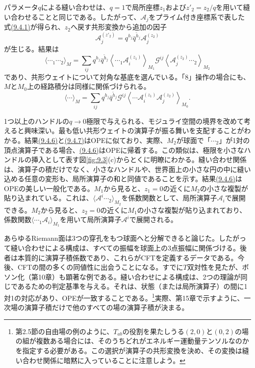 パラメータ$q$による縫い合わせは、$q=1$で局所座標$z_1$および$z'_2=z_2/q$を用いて縫い合わせることと同じである。したがって、$\mathcal A_j$をプライム付き座標系で表した式\hyperref[eq:9.4.1]{(9.4.1)}が得られ、$z_2$へ戻す共形変換から追加の因子
\begin{equation}
 \mathcal A_j^{(z'_2)}=q^{h_j}\bar q^{\tilde h_j}\mathcal A_j^{(z_2)}
 \tag{9.4.5}\label{eq:9.4.5}
\end{equation}
が生じる。結果は
\begin{equation}
 \langle\cdots_1\cdots_2\rangle_M
 =\sum_{ij}q^{h_j}\bar q^{\tilde h_j}
 \left\langle\cdots_1\mathcal A_i^{(z_1)}\right\rangle_{M_1}
 \mathcal G^{ij}\left\langle\mathcal A_j^{(z_2)}\cdots_2\right\rangle_{M_2}
 \tag{9.4.6}\label{eq:9.4.6}
\end{equation}
であり、共形ウェイトについて対角な基底を選んでいる。「$8$」操作の場合にも、$M$と$M_0$上の経路積分は同様に関係づけられる。
\begin{equation}
 \langle\cdots\rangle_M
 =\sum_{ij}q^{h_j}\bar q^{\tilde h_j}\mathcal G^{ij}
 \left\langle\cdots\mathcal A_i^{(z_1)}\mathcal A_j^{(z_2)}\right\rangle_{M_0}.
 \tag{9.4.7}\label{eq:9.4.7}
\end{equation}

1つ以上のハンドルの$q\to0$極限で与えられる、モジュライ空間の境界を改めて考えると興味深い。最も低い共形ウェイトの演算子が振る舞いを支配することがわかる。結果\hyperref[eq:9.4.6]{(9.4.6)}と\hyperref[eq:9.4.7]{(9.4.7)}はOPEに似ており、実際、$M_2$が球面で「$\cdots_2$」が1対の頂点演算子である場合、\hyperref[eq:9.4.6]{(9.4.6)}はOPEに帰着する。この類似は、極限を小さなハンドルの挿入として表す図\ref{fig:9.3}(c)からとくに明瞭にわかる。縫い合わせ関係は、演算子の積だけでなく、小さなハンドルや、世界面上の小さな円の中に縫い込める任意の変形も、局所演算子の和と同値であることを示す。結果\hyperref[eq:9.4.6]{(9.4.6)}はOPEの美しい一般化である。$M_1$から見ると、$z_1=0$の近くに$M_2$の小さな複製が貼り込まれている。これは、$\langle\mathcal A^i\cdots_2\rangle_{M_2}$を係数関数として、局所演算子$\mathcal A_i$で展開できる。$M_2$から見ると、$z_2=0$の近くに$M_1$の小さな複製が貼り込まれており、係数関数$\langle\cdots_1\mathcal A_i\rangle_{M_1}$を用いて局所演算子$\mathcal A^i$で展開される。

あらゆるRiemann面は3つの穿孔をもつ球面へと分解できると論じた。したがって縫い合わせによる構成は、すべての振幅を球面上の3点振幅に関係づける。後者は本質的に演算子積係数であり、これらがCFTを定義するデータである。今後、CFTの間の多くの同値性に出会うことになる。すでに$T$双対性を見たが、ボソン化（第10章）も顕著な例である。縫い合わせによる構成は、2つの理論が同じであるための判定基準を与える。それは、状態（または局所演算子）の間に1対1の対応があり、OPEが一致することである。\footnote[1]{第2.5節の自由場の例のように、$T_{ab}$の役割を果たしうる$(2,0)$と$(0,2)$の場の組が複数ある場合には、そのうちどれがエネルギー運動量テンソルなのかを指定する必要がある。この選択が演算子の共形変換を決め、その変換は縫い合わせ関係に暗黙に入っていることに注意しよう。}実際、第15章で示すように、一次場の演算子積だけで他のすべての場の演算子積が決まる。


